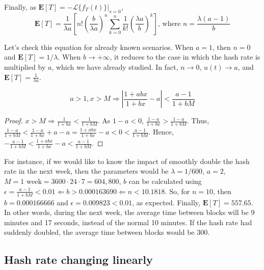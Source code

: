 Finally, as $\mathbf{E}[T] = -\mathcal{L}\{f_T(t)\}|_{s=0}$,
$$\mathbf{E}[T] = \frac{1}{\lambda a} \left[ n! \left(\frac{b}{\lambda a}\right)^n \sum_{k=0}^n \frac{1}{k!} \left( \frac{\lambda a}{b} \right)^{k} \right] \text{, where $n = \frac{\lambda(a-1)}{b}$}$$

Let's check this equation for already known scenarios. When $a=1$, then $n=0$ and $\mathbf{E}[T] = 1/\lambda$. When $b \rightarrow +\infty$, it reduces to the case in which the hash rate is multiplied by $a$, which we have already studied. In fact, $n \rightarrow 0$, $u(t) \rightarrow a$, and $\mathbf{E}[T] = \frac{1}{\lambda a}$.

\begin{theorem}
	$$a > 1, x > M \Rightarrow \left| \frac{1+abx}{1+bx} - a \right| < \frac{a-1}{1+bM}$$
\end{theorem}
\begin{proof}
$x > M \Rightarrow \frac{1}{1+bx} < \frac{1}{1+bM}$. As $1-a<0$, $\frac{1-a}{1+bx} > \frac{1-a}{1+bM}$. Thus, $\frac{1-a}{1+bM} < \frac{1-a}{1+bx} + a - a = \frac{1+abx}{1+bx} - a < 0 < \frac{a-1}{1+bM}$. Hence, $-\frac{a-1}{1+bM} < \frac{1+abx}{1+bx} - a < \frac{a-1}{1+bM}$.
\end{proof}

For instance, if we would like to know the impact of smoothly double the hash rate in the next week, then the parameters would be $\lambda = 1/600$, $a=2$, $M=1\text{ week}=3600\cdot24\cdot7 = 604,800$, $b$ can be calculated using $\epsilon = \frac{a-1}{1+bM} < 0.01 \Leftarrow b > 0.000163690 \Leftarrow n < 10.1818$. So, for $n=10$, then $b=0.000166666$ and $\epsilon = 0.009823 < 0.01$, as expected. Finally, $\mathbf{E}[T] = 557.65$. In other words, during the next week, the average time between blocks will be 9 minutes and 17 seconds, instead of the normal 10 minutes. If the hash rate had suddenly doubled, the average time between blocks would be 300.





\subsection{Hash rate changing linearly}

